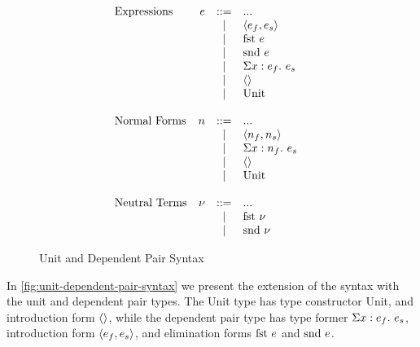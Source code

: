 \begin{figure}[!htb]
  \begin{displaymath}
    \begin{array}{lrcll}
      \text{Expressions} & e & ::= & ... & \\
      & & \mid & \langle e_f, e_s \rangle & \\
      & & \mid & \text{fst } e & \\
      & & \mid & \text{snd } e & \\
      & & \mid & \Sigma x : e_f. \text{ } e_s & \\
      & & \mid & \langle \rangle & \\
      & & \mid & \text{Unit} & \\
      \\
      \text{Normal Forms} & n & ::= & ... & \\
      & & \mid & \langle n_f, n_s \rangle & \\
      & & \mid & \Sigma x : n_f. \text{ } e_s & \\
      & & \mid & \langle \rangle & \\
      & & \mid & \text{Unit} & \\
      \\
      \text{Neutral Terms} & \nu & ::= & ... & \\
      & & \mid & \text{fst } \nu & \\
      & & \mid & \text{snd } \nu & \\
    \end{array}
  \end{displaymath}
  \caption{Unit and Dependent Pair Syntax}
  \label{fig:unit-dependent-pair-syntax}
\end{figure}

In \autoref{fig:unit-dependent-pair-syntax} we present the extension of the syntax with the unit and dependent pair types.
The Unit type has type constructor Unit, and introduction form $\langle \rangle$, while the dependent pair type has type former $\Sigma x : e_f. \text{ } e_s$, introduction form $\langle e_f, e_s \rangle$, and elimination forms $\text{fst } e$ and $\text{snd } e$.

